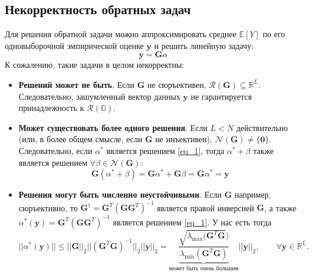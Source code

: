 \documentclass[a4paper,12pt]{article}
\theoremstyle{plain}
\theoremstyle{definition}
\theoremstyle{remark}
\begin{document}
\subsection{Некорректность обратных задач}
Для решения обратной задачи можно аппроксимировать 
среднее $\mathbb{E}[Y]$ по его одновыборочной эмпирической 
оценке $\textbf{y}$ и решить линейную задачу:
\begin{equation}
\label{eq_1}
\textbf{y} = \textbf{G} \alpha
\end{equation}
К сожалению, такие задачи в целом некорректны:
\begin{itemize}
\item \textbf{Решений может не быть}. 
Если $\textbf{G}$ не сюръективен,
$\mathcal{R}(\textbf{G}) \subseteq \mathbb{R}^L$. 
Следовательно, зашумленный вектор данных $\textbf{y}$ 
не гарантируется принадлежность к $\mathcal{R}(\mathbb{G})$.
\item \textbf{Может существовать более одного решения}. 
Если $L < N$ действительно (или, в более общем смысле, если 
$\textbf{G}$ не инъективен), 
$\mathcal{N}(\textbf{G}) \neq \{ \textbf{0} \}$. 
Следовательно, если $\alpha^{*}$ является решением 
\eqref{eq_1}, тогда $\alpha^{*} + \beta$ также является решением
$\forall \beta \in \mathcal{N}(\textbf{G})$:
\[
\textbf{G}(\alpha^{*} + \beta) =
\textbf{G} \alpha^{*} + \textbf{G} \beta =
\textbf{G} \alpha^{*} = \textbf{y}
\]
\item \textbf{Решения могут быть численно неустойчивыми}.
Если $\textbf{G}$ например, сюръективно, то
$\textbf{G}^{\dagger} = 
\textbf{G}^{T}(\textbf{G} \textbf{G}^{T})^{-1}$
является правой инверсией $\textbf{G}$,
а также 
$\alpha^{*}(\textbf{y}) =
\textbf{G}^{T}(\textbf{G} \textbf{G}^{T})^{-1}$
является решением \eqref{eq_1}. 
У нас есть тогда
\[
||\alpha^{*}(\textbf{y})|| \leq
||\textbf{G}||_{2}
||(\textbf{G}^{T} \textbf{G})^{-1}||_2
||\textbf{y}||_2 =
\underbrace{
\dfrac{
\sqrt{\lambda_{\text{max}}(\textbf{G}^{T}\textbf{G}})
}{
\lambda_{\text{min}}(\textbf{G}^{T}\textbf{G})
}}_{\text{может быть очень большим}} 
||\textbf{y}||_2, \qquad 
\forall \textbf{y} \in \mathbb{R}^L.
\]
\end{itemize}
\end{document}
